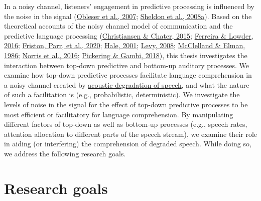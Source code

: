 \documentclass[a4paper, nobind]{templates/ociamthesis}
\begin{document}
In a noisy channel, listeners' engagement in predictive processing is influenced by the noise in the signal (\protect\hyperlink{ref-Obleser2007}{Obleser et al., 2007}; \protect\hyperlink{ref-Sheldon2008a}{Sheldon et al., 2008a}).
Based on the theoretical accounts of the noisy channel model of communication and the predictive language processing (\protect\hyperlink{ref-Christiansen2015}{Christiansen \& Chater, 2015}; \protect\hyperlink{ref-Ferreira2016}{Ferreira \& Lowder, 2016}; \protect\hyperlink{ref-Friston2020}{Friston, Parr, et al., 2020}; \protect\hyperlink{ref-Hale2001}{Hale, 2001}; \protect\hyperlink{ref-Levy2008}{Levy, 2008}; \protect\hyperlink{ref-Mcclelland1986}{McClelland \& Elman, 1986}; \protect\hyperlink{ref-Norris2016}{Norris et al., 2016}; \protect\hyperlink{ref-Pickering2018}{Pickering \& Gambi, 2018}),
this thesis investigates the interaction between top-down predictive and bottom-up auditory processes.
We examine how top-down predictive processes facilitate language comprehension in a noisy channel created by \protect\hyperlink{speech-processing}{acoustic degradation of speech},
and what the nature of such a facilitation is (e.g., probabilistic, deterministic).
We investigate the levels of noise in the signal for the effect of top-down predictive processes to be most efficient or facilitatory for language comprehension.
By manipulating different factors of top-down as well as bottom-up processes (e.g., speech rates, attention allocation to different parts of the speech stream),
we examine their role in aiding (or interfering) the comprehension of degraded speech.
While doing so, we address the following research goals.

\hypertarget{research-goals}{%
\section{Research goals}\label{research-goals}}
\end{document}
